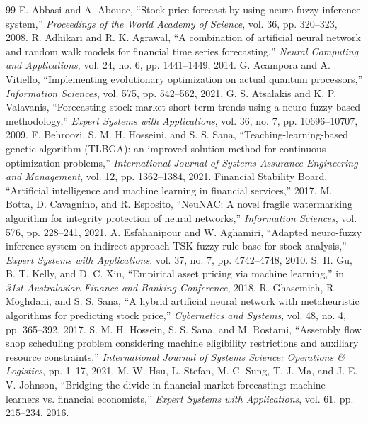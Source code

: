 \documentclass[conference]{IEEEtran}
\begin{document}
\begin{thebibliography}{99}
 E. Abbasi and A. Abouec, ``Stock price forecast by using neuro-fuzzy inference system,'' \emph{Proceedings of the World Academy of Science}, vol. 36, pp. 320--323, 2008.
 R. Adhikari and R. K. Agrawal, ``A combination of artificial neural network and random walk models for financial time series forecasting,'' \emph{Neural Computing and Applications}, vol. 24, no. 6, pp. 1441--1449, 2014.
 G. Acampora and A. Vitiello, ``Implementing evolutionary optimization on actual quantum processors,'' \emph{Information Sciences}, vol. 575, pp. 542--562, 2021.
 G. S. Atsalakis and K. P. Valavanis, ``Forecasting stock market short-term trends using a neuro-fuzzy based methodology,'' \emph{Expert Systems with Applications}, vol. 36, no. 7, pp. 10696--10707, 2009.
 F. Behroozi, S. M. H. Hosseini, and S. S. Sana, ``Teaching-learning-based genetic algorithm (TLBGA): an improved solution method for continuous optimization problems,'' \emph{International Journal of Systems Assurance Engineering and Management}, vol. 12, pp. 1362--1384, 2021.
 Financial Stability Board, ``Artificial intelligence and machine learning in financial services,'' 2017.
 M. Botta, D. Cavagnino, and R. Esposito, ``NeuNAC: A novel fragile watermarking algorithm for integrity protection of neural networks,'' \emph{Information Sciences}, vol. 576, pp. 228--241, 2021.
 A. Esfahanipour and W. Aghamiri, ``Adapted neuro-fuzzy inference system on indirect approach TSK fuzzy rule base for stock analysis,'' \emph{Expert Systems with Applications}, vol. 37, no. 7, pp. 4742--4748, 2010.
 S. H. Gu, B. T. Kelly, and D. C. Xiu, ``Empirical asset pricing via machine learning,'' in \emph{31st Australasian Finance and Banking Conference}, 2018.
 R. Ghasemieh, R. Moghdani, and S. S. Sana, ``A hybrid artificial neural network with metaheuristic algorithms for predicting stock price,'' \emph{Cybernetics and Systems}, vol. 48, no. 4, pp. 365--392, 2017.
 S. M. H. Hossein, S. S. Sana, and M. Rostami, ``Assembly flow shop scheduling problem considering machine eligibility restrictions and auxiliary resource constraints,'' \emph{International Journal of Systems Science: Operations \& Logistics}, pp. 1--17, 2021.
 M. W. Hsu, L. Stefan, M. C. Sung, T. J. Ma, and J. E. V. Johnson, ``Bridging the divide in financial market forecasting: machine learners vs. financial economists,'' \emph{Expert Systems with Applications}, vol. 61, pp. 215--234, 2016.

\end{thebibliography}
\end{document}
